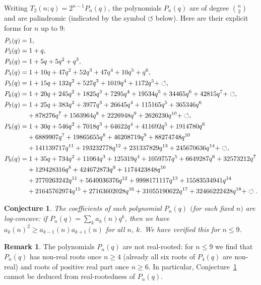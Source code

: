 \documentclass[10pt,a4paper]{amsart}
\numberwithin{equation}{section}
\newtheorem{Conjecture}[Theorem]{Conjecture}
\theoremstyle{definition}
\newtheorem{Remark}[Theorem]{Remark}
\begin{document}
Writing $T_2(n;q) = 2^{n-1} P_n(q)$, the polynomials $P_n(q)$ are of degree
$\binom{n}{2}$ and are palindromic (indicated by the symbol $\circlearrowleft$
below).
Here are their explicit forms for $n$ up to $9$:
\begin{align*}
&P_1(q)= 1, \\
&P_2(q)= 1+q, \\
&P_3(q)= 1+5q+5q^2+q^3, \\
&P_4(q)= 1+10q+47q^2+52q^3+47q^4+10q^5+q^6, \\
&P_5(q)= 1+15q+132q^2+527q^3+1019q^4+1172q^5+\circlearrowleft
	, \\
&P_6(q)= 1+20q+245q^2+1825q^3+7295q^4+19534q^5+34465q^6
	+42815q^7+\circlearrowleft, \\
&P_7(q)= 1+25q+383q^2+3977q^3+26645q^4+115165q^5+365346q^6 \\
&\hphantom{P_7(q)= }{}
+878276q^7+1563964q^8+2226948q^9+2626230q^{10}+\circlearrowleft, \\
&P_8(q)= 1+30q+546q^2+7018q^3+64622q^4+411692q^5+1914780q^6 \\
       &\hphantom{P_8(q)=}{}
        +6889907q^7+19865655q^8+46208719q^9+88274748q^{10} \\
       &\hphantom{P_8(q)=}{} +141139717q^{11}+193232778q^{12}+231337829q^{13}+245670636q^{14} +\circlearrowleft,\\
&P_9(q)=
	1 + 35q + 734q^2 + 11064q^3 + 125319q^4 + 1059757q^5 + 6649287q^6 + 32573212q^7\\
       &\hphantom{P_9(q)=}{}+ 129428316q^8 + 424672873q^9 + 1174423848q^{10} \\
        &
 \hphantom{P_9(q)=}{}
        + 2770263242q^{11} +
	5640036376q^{12}  + 9998171117q^{13} + 15583534941q^{14}
\\       &\hphantom{P_9(q)=}{}
	+21645762974q^{15}   + 27163602028q^{16} + 31055190622q^{17} +
	32466222428q^{18} + \circlearrowleft.
\end{align*}

\begin{Conjecture}
	\label{conj:log_concavity} The coefficients of each polynomial $P_n(q)$
	$($for each fixed $n)$ are
	log-concave: if $P_n(q) = \sum_{k} a_k(n) q^k$, then we have
	$a_k(n)^2 \ge a_{k-1}(n) a_{k+1}(n)$ for all $n$, $k$.
	We have verified this for $n \le 9$.
\end{Conjecture}

\begin{Remark}
	\label{rem:not_real_rooted}
	The polynomials $P_n(q)$ are not real-rooted: for $n\le9$ we find that
	$P_n(q)$ has non-real roots once $n\ge4$ (already all six roots of $P_4(q)$
	are non-real) and roots of positive real part once $n\ge6$.
	In particular, Conjecture~\ref{conj:log_concavity} cannot be deduced from
	real-rootedness of $P_n(q)$.
\end{Remark}
\end{document}

